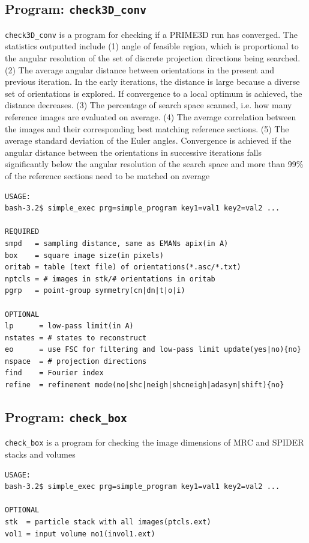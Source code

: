 \documentclass[a4paper,11pt]{article}
\newcommand{\prgname}[1]{\textcolor{NavyBlue}{\texttt{#1}}}
\begin{document}
\subsection{Program: \prgname{check3D\_conv}}
\label{check3D_conv}
\prgname{check3D\_conv} is a program for checking if a PRIME3D run has converged. The statistics outputted include (1) angle of feasible region, which is proportional to the angular resolution of the set of discrete projection directions being searched. (2) The average angular distance between orientations in the present and previous iteration. In the early iterations, the distance is large because a diverse set of orientations is explored. If convergence to a local optimum is achieved, the distance decreases. (3) The percentage of search space scanned, i.e. how many reference images are evaluated on average. (4) The average correlation between the images and their corresponding best matching reference sections. (5) The average standard deviation of the Euler angles. Convergence is achieved if the angular distance between the orientations in successive iterations falls significantly below the angular resolution of the search space and more than 99\% of the reference sections need to be matched on average 

\begin{verbatim}
USAGE:
bash-3.2$ simple_exec prg=simple_program key1=val1 key2=val2 ...

REQUIRED
smpd   = sampling distance, same as EMANs apix(in A)
box    = square image size(in pixels)
oritab = table (text file) of orientations(*.asc/*.txt)
nptcls = # images in stk/# orientations in oritab
pgrp   = point-group symmetry(cn|dn|t|o|i)

OPTIONAL
lp      = low-pass limit(in A)
nstates = # states to reconstruct
eo      = use FSC for filtering and low-pass limit update(yes|no){no}
nspace  = # projection directions
find    = Fourier index
refine  = refinement mode(no|shc|neigh|shcneigh|adasym|shift){no}
\end{verbatim}

\subsection{Program: \prgname{check\_box}}
\label{check_box}
\prgname{check\_box} is a program for checking the image dimensions of MRC and SPIDER stacks and volumes

\begin{verbatim}
USAGE:
bash-3.2$ simple_exec prg=simple_program key1=val1 key2=val2 ...

OPTIONAL
stk  = particle stack with all images(ptcls.ext)
vol1 = input volume no1(invol1.ext)
\end{verbatim}
\end{document}
